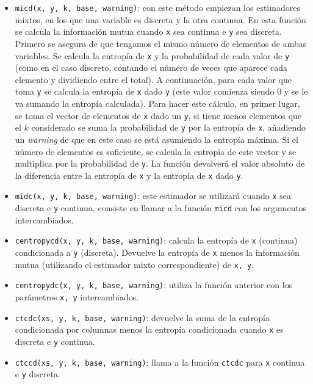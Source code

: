 \documentclass[12pt,a4paper]{report} %
\theoremstyle{definition}
\begin{document}
\begin{itemize}
\item \texttt{micd(x, y, k, base, warning)}: con este método empiezan los estimadores mixtos, en los que una variable es discreta y la otra continua. En esta función se calcula la información mutua cuando \texttt{x} sea continua e \texttt{y} sea discreta. Primero se asegura de que tengamos el mismo número de elementos de ambas variables. Se calcula la entropía de \texttt{x} y la probabilidad de cada valor de \texttt{y} (como en el caso discreto, contando el número de veces que aparece cada elemento y dividiendo entre el total). A continuación, para cada valor que toma \texttt{y} se calcula la entropía de \texttt{x} dado \texttt{y} (este valor comienza siendo $0$ y se le va sumando la entropía calculada). Para hacer este cálculo, en primer lugar, se toma el vector de elementos de \texttt{x} dado un \texttt{y}, si tiene menos elementos que el $k$ considerado se suma la probabilidad de \texttt{y} por la entropía de \texttt{x}, añadiendo un \textit{warning} de que en este caso se está asumiendo la entropía máxima. Si el número de elementos es suficiente, se calcula la entropía de este vector y se multiplica por la probabilidad de \texttt{y}. La función devolverá el valor absoluto de la diferencia entre la entropía de \texttt{x} y la entropía de \texttt{x} dado \texttt{y}.

\item \texttt{midc(x, y, k, base, warning)}: este estimador se utilizará cuando \texttt{x} sea discreta e \texttt{y} continua, consiste en llamar a la función \texttt{micd} con los argumentos intercambiados.

\item \texttt{centropycd(x, y, k, base, warning)}: calcula la entropía de \texttt{x} (continua) condicionada a \texttt{y} (discreta). Devuelve la entropía de \texttt{x} menos la información mutua (utilizando el estimador mixto correspondiente) de \texttt{x, y}.

\item \texttt{centropydc(x, y, k, base, warning)}: utiliza la función anterior con los parámetros \texttt{x, y} intercambiados.

\item \texttt{ctcdc(xs, y, k, base, warning)}: devuelve la suma de la entropía condicionada por columnas menos la entropía condicionada cuando \texttt{x} es discreta e \texttt{y} continua.

\item \texttt{ctccd(xs, y, k, base, warning)}: llama a la función \texttt{ctcdc} para \texttt{x} continua e \texttt{y} discreta.


\end{itemize}
\end{document}
